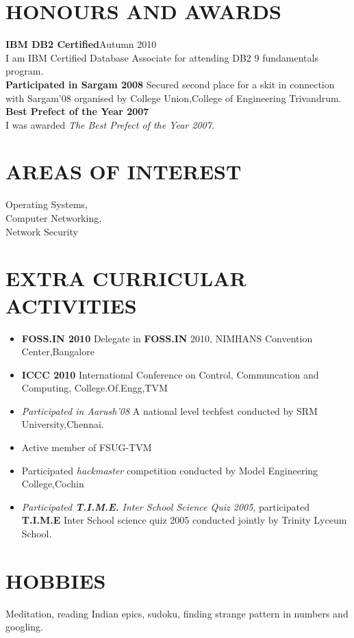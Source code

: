 \begin{resume}
\section{\textsc{HONOURS AND AWARDS}}{
  \textbf{IBM DB2 Certified}\hfill Autumn 2010\\
  I am IBM Certified Database Associate for attending DB2 9 fundamentals program.\\
  \textbf{Participated in Sargam 2008}\newline
  Secured second place for a skit in connection with Sargam'08 organised by College Union,College of Engineering Trivandrum.\newline
  \textbf{Best Prefect of the Year 2007}\\
  I was awarded {\it The Best Prefect of the Year 2007}.\\
}

\section{\textsc{AREAS OF INTEREST}}{
  Operating Systems,\\
  Computer Networking,\\
  Network Security
}

\section{\textsc{EXTRA CURRICULAR ACTIVITIES}} {
  \begin{itemize}
  \item \textbf{FOSS.IN 2010}\newline
    Delegate in {\bf FOSS.IN} 2010, NIMHANS Convention Center,Bangalore \newpage
  \item \textbf{ICCC 2010}\newline
    International Conference on Control, Communcation and Computing,\newline
    College.Of.Engg,TVM
  \item {\it Participated in Aarush'08} A national level techfest conducted by SRM University,Chennai.
  \item  Active member of FSUG-TVM
  \item  Participated {\it hackmaster} competition conducted by Model Engineering College,Cochin
  \item {\it Participated {\bf T.I.M.E.} Inter School Science Quiz 2005},
    participated {\bf T.I.M.E} Inter School science quiz 2005 conducted jointly by Trinity Lyceum School.
  \end{itemize}
}

\section{\textsc{HOBBIES}}{
  Meditation, reading Indian epics, sudoku, finding strange pattern in numbers and googling.\\
}
\end{resume}

